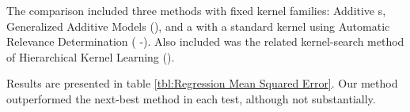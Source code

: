 The comparison included three methods with fixed kernel families: Additive \gp{}s, Generalized Additive Models (\GAM{}), and a \gp{} with a standard \kSE{} kernel using Automatic Relevance Determination (\gp{} \kSE{}-\ARD{}).  Also included was the related kernel-search method of Hierarchical Kernel Learning (\HKL{}).

Results are presented in table \ref{tbl:Regression Mean Squared Error}.  Our method outperformed the next-best method in each test, although not substantially.

%
%
%
%
%
%
%
%
%


